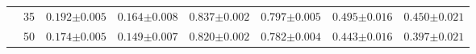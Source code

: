 \begin{table}[htp]
\begin{tabularx}{\textwidth}{l|c|CCCCCC}
&35 & $0.192{\scriptstyle\pm0.005}$ & $0.164{\scriptstyle\pm0.008}$ & $0.837{\scriptstyle\pm0.002}$ & $0.797{\scriptstyle\pm0.005}$ & $0.495{\scriptstyle\pm0.016}$ & $0.450{\scriptstyle\pm0.021}$ \\
&50 & $0.174{\scriptstyle\pm0.005}$ & $0.149{\scriptstyle\pm0.007}$ & $0.820{\scriptstyle\pm0.002}$ & $0.782{\scriptstyle\pm0.004}$ & $0.443{\scriptstyle\pm0.016}$ & $0.397{\scriptstyle\pm0.021}$ \\
\bottomrule
\end{tabularx}
\end{table}
